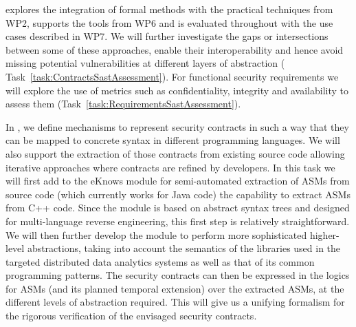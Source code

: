 \begin{Workpackage}{\thewpno}
\begin{WPDescription}
\theWP{} explores the integration of formal methods with the practical techniques from WP2, supports the tools from WP6 and is evaluated throughout with the use cases described in WP7.
We will further investigate the gaps or intersections between some of these approaches, enable their interoperability and hence avoid missing potential vulnerabilities at different layers of abstraction (%
Task~\ref{task:ContractsSastAssessment}). 
For functional security requirements we will explore the use of metrics such as confidentiality, integrity and availability to assess them (Task~\ref{task:RequirementsSastAssessment}).


\end{WPDescription}


\begin{Task}
\TaskResults{%
\ref{del:formal1},
\ref{del:formal2},
\ref{del:formal3}
}
\TaskHeader{}

In \theTask, we define mechanisms to represent security contracts
in such a way that they can be mapped to concrete syntax in different
programming languages. We will also support the extraction of those contracts
from existing source code allowing iterative approaches where contracts
are refined by developers.
In this task we will first add to the \textsf{eKnows} module for semi-automated extraction of ASMs from source code (which currently works for Java code) the capability to extract ASMs from C++ code. Since the module is based on abstract syntax trees and designed for multi-language reverse engineering, this first step is relatively straightforward.
We will then further develop the module to perform more sophisticated higher-level abstractions, taking into account the semantics of the libraries used in the targeted distributed data analytics systems as well as that of its common programming patterns. The security contracts can then be expressed in the logics for ASMs (and its planned temporal extension) over the extracted ASMs, at the different levels of abstraction required. This will give us a unifying formalism for the rigorous verification of the envisaged security contracts.  
\end{Task}


\end{Workpackage}
